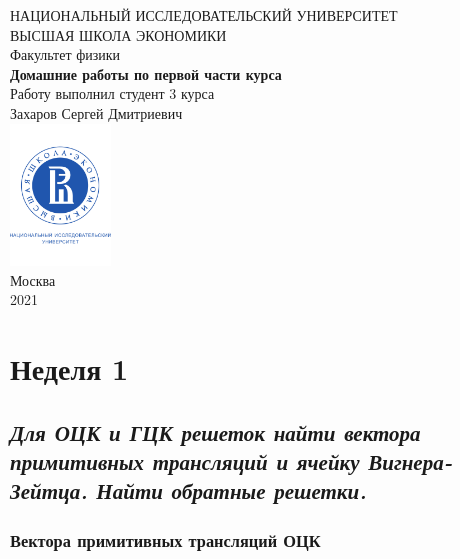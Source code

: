 \documentclass[a4paper, 12pt]{article}
\begin{document}
	\begin{titlepage}
		\begin{center}
			$$$$
			$$$$
			$$$$
			$$$$
			{\Large{НАЦИОНАЛЬНЫЙ ИССЛЕДОВАТЕЛЬСКИЙ УНИВЕРСИТЕТ}}\\
			\vspace{0.1cm}
			{\Large{ВЫСШАЯ ШКОЛА ЭКОНОМИКИ}}\\
			\vspace{0.25cm}
			{\large{Факультет физики}}\\
			\vspace{5.5cm}
			{\Huge\textbf{{Домашние работы по первой части курса}}}\\%
			\vspace{2cm}
			{Работу выполнил студент 3 курса}\\
			{Захаров Сергей Дмитриевич}\\
			\vfill
			\includegraphics[width = 0.2\textwidth]{HSElogo}\\
			\vfill
			Москва\\
			2021
		\end{center}
	\end{titlepage}
	
\tableofcontents


\newpage

\section{Неделя 1}

\subsection{\textit{Для ОЦК и ГЦК решеток найти вектора примитивных трансляций и ячейку Вигнера-Зейтца. Найти обратные решетки.}}

\subsubsection{Вектора примитивных трансляций ОЦК}
\end{document}
